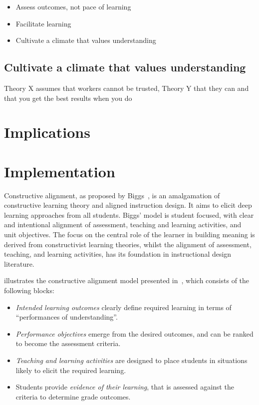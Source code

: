 \begin{itemize}
	\item Assess outcomes, not pace of learning
	\item Facilitate learning 
	\item Cultivate a climate that values understanding
\end{itemize}


\subsection{Cultivate a climate that values understanding} %
\label{sub:cultivate_a_climate_that_values_understanding}

\citet{McGregor:1960}

Theory X assumes that workers cannot be trusted, Theory Y that they can and that you get the best results when you do




\section{Implications} %
\label{sec:implications}


\section{Implementation} %
\label{sec:design}

Constructive alignment, as proposed by Biggs~\cite{Biggs:1996c}, is an amalgamation of constructive learning theory and aligned instruction design. It aims to elicit deep learning approaches from all students. Biggs' model is student focused, with clear and intentional alignment of assessment, teaching and learning activities, and unit objectives. The focus on the central role of the learner in building meaning is derived from constructivist learning theories, whilst the alignment of assessment, teaching, and learning activities, has its foundation in instructional design literature. 

 illustrates the constructive alignment model presented in~\cite{Houghton:2004}, which consists of the following blocks:

\begin{itemize}
	\item \emph{Intended learning outcomes} clearly define required learning in terms of ``performances of understanding''.
	\item \emph{Performance objectives} emerge from the desired outcomes, and can be ranked to become the assessment criteria.
	\item \emph{Teaching and learning activities} are designed to place students in situations likely to elicit the required learning.
	\item Students provide \emph{evidence of their learning}, that is assessed against the criteria to determine grade outcomes.
\end{itemize}

